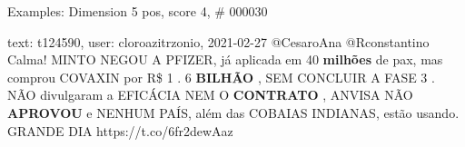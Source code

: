 \begin{frame}{Examples: Dimension 5 pos, score 4, \# 000030}
\footnotesize
\begin{exampleblock}{text: t124590, user: cloroazitrzonio, 2021-02-27}
@CesaroAna @Rconstantino Calma! MINTO NEGOU A PFIZER, já aplicada em 40 
\textbf{milhões} de pax, mas comprou COVAXIN por R\$ 1 . 6 \textbf{BILHÃO} , 
SEM CONCLUIR A FASE 3 . NÃO divulgaram a EFICÁCIA NEM O \textbf{CONTRATO} , 
ANVISA NÃO \textbf{APROVOU} e NENHUM PAÍS, além das COBAIAS INDIANAS, estão 
usando. GRANDE DIA  
https://t.co/6fr2dewAaz 
\end{exampleblock}
\end{frame}
